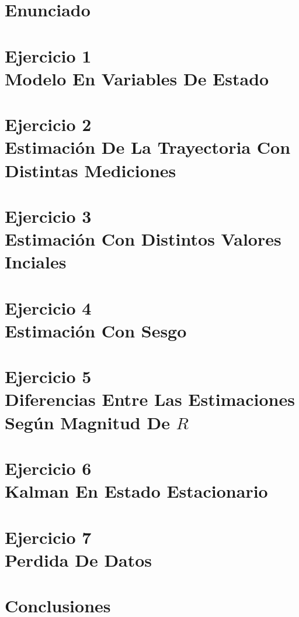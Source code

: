 \documentclass[10pt,a4paper]{article}
\begin{document}
		
	\setcounter{page}{1}

	\section{Enunciado}
		

	\section{Ejercicio 1 \\ Modelo En Variables De Estado}\label{sec:ej1}
		
		
	\section{Ejercicio 2 \\ Estimación De La Trayectoria Con Distintas Mediciones}\label{sec:ej2}
		

	\section{Ejercicio 3 \\ Estimación Con Distintos Valores Inciales}\label{sec:ej3}
		

	\section{Ejercicio 4 \\ Estimación Con Sesgo}\label{sec:ej4}
		

	\section{Ejercicio 5 \\ Diferencias Entre Las Estimaciones Según Magnitud De $R$}\label{sec:ej5}
		

	\section{Ejercicio 6 \\ Kalman En Estado Estacionario}\label{sec:ej6}
		

	\section{Ejercicio 7 \\ Perdida De Datos}\label{sec:ej7}
		

	\section{Conclusiones}\label{sec:conclusiones}
		

\end{document}
